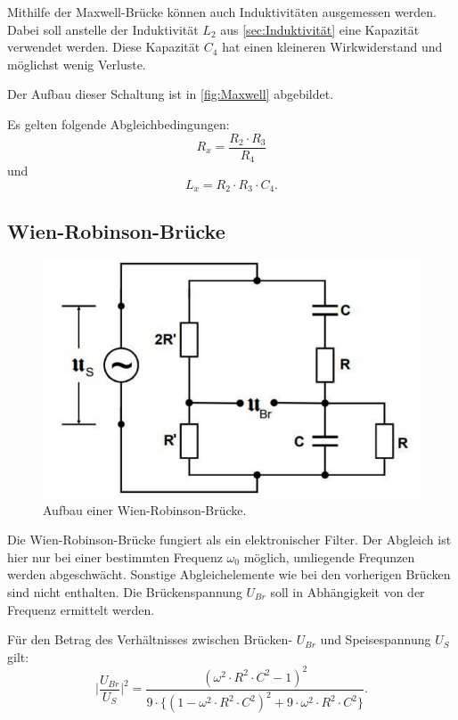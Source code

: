 Mithilfe der Maxwell-Brücke können auch Induktivitäten ausgemessen werden.
Dabei soll anstelle der Induktivität $L_2$ aus \ref{sec:Induktivität} eine Kapazität verwendet werden.
Diese Kapazität $C_4$ hat einen kleineren Wirkwiderstand und möglichst wenig Verluste.

Der Aufbau dieser Schaltung ist in \ref{fig:Maxwell} abgebildet.

Es gelten folgende Abgleichbedingungen:
\begin{equation}
    R_x = \frac{R_2 \cdot R_3}{R_4}
\end{equation}
und
\begin{equation}
    L_x = R_2 \cdot R_3 \cdot C_4 .
\end{equation}

\subsection{Wien-Robinson-Brücke}

\begin{figure}
    \centering
    \includegraphics[width=\textwidth]{WienRobinBruecke.pdf}
    \caption{Aufbau einer Wien-Robinson-Brücke. \cite{anleitung}}
\end{figure}

Die Wien-Robinson-Brücke fungiert als ein elektronischer Filter.
Der Abgleich ist hier nur bei einer bestimmten Frequenz $\omega_0$ möglich, umliegende Frequnzen werden abgeschwächt.
Sonstige Abgleichelemente wie bei den vorherigen Brücken sind nicht enthalten.
Die Brückenspannung $U_{Br}$ soll in Abhängigkeit von der Frequenz ermittelt werden.

Für den Betrag des Verhältnisses zwischen Brücken- $U_{Br}$ und Speisespannung $U_S$ gilt:
\begin{equation}
    \label{eq:U_br durch U_s}
    \lvert{\frac{U_{Br}}{U_S}}\rvert^2 = \frac{(\omega^2 \cdot R^2 \cdot C^2 - 1)^2}{9 \cdot \{(1 - \omega^2 \cdot R^2 \cdot C^2)^2 + 9 \cdot \omega^2 \cdot R^2 \cdot C^2\}} .
\end{equation}

